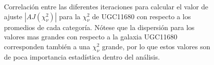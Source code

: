 \begin{figure}[htbp]
\centering
{}
\caption[Correlación entre ajuster]{Correlación entre las diferentes iteraciones para calcular el valor de ajuste $|AJ(\chi^{2}_{\nu})|$ para la $\chi^{2}_{\nu}$ de UGC11680 con respecto a los promedios de cada categoría. Nótese que la dispersión para los valores mas grandes con respecto a la galaxia UGC11680 corresponden también a una $\chi^{2}_{\nu}$ grande, por lo que estos valores son de poca importancia estadística dentro del análisis.}
\label{correlacion}
\end{figure}


